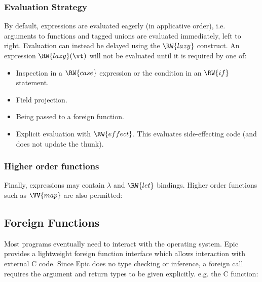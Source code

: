 \subsubsection*{Evaluation Strategy}

By default, expressions are evaluated eagerly (in applicative order),
i.e. arguments to functions and tagged unions are evaluated
immediately, left to right. Evaluation can instead be delayed using
the $\RW{lazy}$ construct. An expression $\RW{lazy}(\vt)$ will not be
evaluated until it is required by one of:

\begin{itemize}
\item Inspection in a $\RW{case}$ expression or the condition in an
  $\RW{if}$ statement.
\item Field projection.
\item Being passed to a foreign function.
\item Explicit evaluation with $\RW{effect}$. This evaluates
  side-effecting code (and does not update the thunk).
\end{itemize}


\subsubsection*{Higher order functions}

Finally, expressions may contain $\lambda$ and $\RW{let}$
bindings. Higher order functions such as $\VV{map}$ are also permitted:


\subsection{Foreign Functions}

Most programs eventually need to interact with the operating
system. Epic provides a lightweight foreign function interface which
allows interaction with external C code.
Since Epic does no type checking or inference,
a foreign call requires the argument and return types to be given
explicitly. e.g. the C function:

